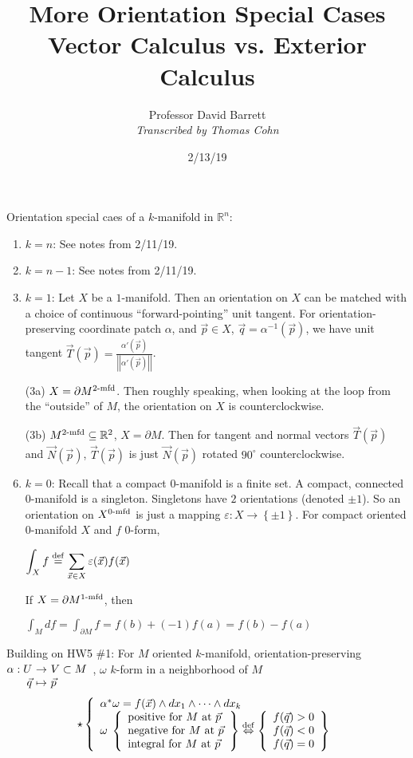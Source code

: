 \documentclass[10pt,letterpaper]{article}
\author{Professor David Barrett\\ \small\textit{Transcribed by Thomas Cohn}}
\title{More Orientation Special Cases\\Vector Calculus vs. Exterior Calculus}
\date{2/13/19} %
\newcommand{\n}{\hfill\break}
\newcommand{\ptxt}[1]{\textrm{\textnormal{#1}}}
\newcommand{\inlineeq}[1]{\centerline{$\displaystyle #1$}}
\newcommand{\set}[1]{\left\{#1\right\}}
\newcommand{\reals}{\mathbb{R}}
\newcommand{\R}{\reals}
\newcommand{\inv}{^{-1}}
\newcommand{\abs}[1]{\left|#1\right|}
\renewcommand{\epsilon}{\varepsilon}
\newcommand{\map}[4]{\!\!\!\begin{array}[t]{rcl}#1 & \!\!\!\!\to & \!\!\!\!#2\\ #3 & \!\!\!\!\mapsto & \!\!\!\!#4\end{array}}
\newcommand{\norm}[1]{\abs{\abs{#1}}}
\newcommand{\iffdef}{\overset{\ptxt{def}}{\Leftrightarrow}}
\newcommand{\eqdef}{\overset{\ptxt{def}}{=}}
\begin{document}
\maketitle
\setlength\RaggedRightParindent{\parindent}
\RaggedRight

\par\noindent Orientation special caes of a $k$-manifold in $\R^{n}$:
\begin{enumerate}[label=(\arabic*)]
	\item $k=n$: See notes from 2/11/19.
	\item $k=n-1$: See notes from 2/11/19.
	\item $k=1$: Let $X$ be a $1$-manifold. Then an orientation on $X$ can be matched with a choice of continuous ``forward-pointing'' unit tangent. For orientation-preserving coordinate patch $\alpha$, and $\vec{p}\in{}X$, $\vec{q}=\alpha\inv(\vec{p})$, we have unit tangent $\vec{T}(\vec{p})=\frac{\alpha'(\vec{p})}{\norm{\alpha'(\vec{p})}}$.
	\item[(3a)] $X=\partial{}M^{2\ptxt{-mfd}}$. Then roughly speaking, when looking at the loop from the ``outside'' of $M$, the orientation on $X$ is counterclockwise.
	\item[(3b)] $M^{2\ptxt{-mfd}}\subseteq\R^{2}$, $X=\partial{}M$. Then for tangent and normal vectors $\vec{T}(\vec{p})$ and $\vec{N}(\vec{p})$, $\vec{T}(\vec{p})$ is just $\vec{N}(\vec{p})$ rotated $90^{\circ}$ counterclockwise.
	\item $k=0$: Recall that a compact $0$-manifold is a finite set. A compact, connected $0$-manifold is a singleton. Singletons have $2$ orientations (denoted $\pm{}1$).\n
	So an orientation on $X^{0\ptxt{-mfd}}$ is just a mapping $\epsilon:X\to\set{\pm{}1}$. For compact oriented $0$-manifold $X$ and $f$ $0$-form,\n
	\inlineeq{
		\int_{X}f\eqdef\sum_{\vec{x}\in{}X}\epsilon(\vec{x})f(\vec{x})
	}
	If $X=\partial{}M^{1\ptxt{-mfd}}$, then\n
	\inlineeq{
		\int_{M}df=\int_{\partial{}M}f=f(b)+(-1)f(a)=f(b)-f(a)
	}
\end{enumerate}

\par\noindent Building on HW5 \#1:\n
For $M$ oriented $k$-manifold, orientation-preserving $\map{\alpha:U}{V\subset{}M}{\vec{q}}{\vec{p}}$, $\omega$ $k$-form in a neighborhood of $M$
\[
\star\left\{\begin{array}{l}\alpha^{*}\omega=f(\vec{x})\wedge{}dx_{1}\wedge\cdots\wedge{}dx_{k}\\
\omega\;\left\{\begin{array}{l}
\ptxt{positive for $M$ at $\vec{p}$}\\
\ptxt{negative for $M$ at $\vec{p}$}\\
\ptxt{integral for $M$ at $\vec{p}$}
\end{array}\right\}\iffdef\left\{
\begin{array}{l}
f(\vec{q})>0\\
f(\vec{q})<0\\
f(\vec{q})=0
\end{array}
\right\}
\end{array}\right.
\]
\end{document}
